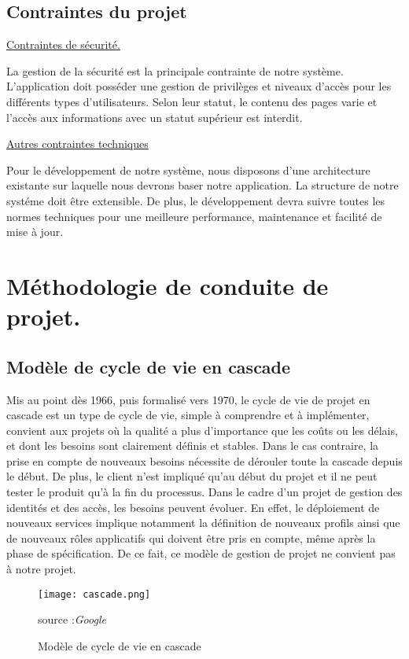 {{\subsection{Contraintes du projet}

\underline{Contraintes de sécurité.}

La gestion de la sécurité est la principale contrainte de notre système. L’application doit posséder une gestion de privilèges et niveaux d’accès pour les différents types d’utilisateurs. Selon leur statut, le contenu des pages varie et l’accès aux informations avec un statut supérieur est interdit.

\underline{Autres contraintes techniques}

Pour le développement de notre système, nous disposons d’une architecture existante sur laquelle nous devrons baser notre application. La structure de notre systéme doit être extensible. De plus, le développement devra suivre toutes les normes techniques pour une meilleure performance, maintenance et facilité de mise à jour.

\section{Méthodologie de conduite de projet.}

\subsection{Modèle de cycle de vie en cascade\cite{Ref13}}

Mis au point dès 1966, puis formalisé vers 1970, le cycle de vie de projet en cascade est un type de cycle de vie, simple à comprendre et à implémenter, convient aux projets où la qualité a plus d’importance que les coûts ou les délais, et dont les besoins sont clairement définis et stables. Dans le cas contraire, la prise en compte de nouveaux besoins nécessite de dérouler toute la cascade depuis le début. De plus, le client n’est impliqué qu’au début du projet et il ne peut tester le produit qu’à la fin du processus. Dans le cadre d’un projet de gestion des identités et des accès, les besoins peuvent évoluer. En effet, le déploiement de nouveaux services implique notamment la définition de nouveaux profils ainsi que de nouveaux rôles applicatifs qui doivent être pris en compte, même après la phase de spécification. De ce fait, ce modèle de gestion de projet ne convient pas à notre projet.

\begin{figure}[H]
	\centering
	\texttt{[image: cascade.png]}
	\caption{Modèle de cycle de vie en cascade}{ \begin{center} source :\textit{Google} \end{center}}
	\label{fig:cascade}
\end{figure}

}}
